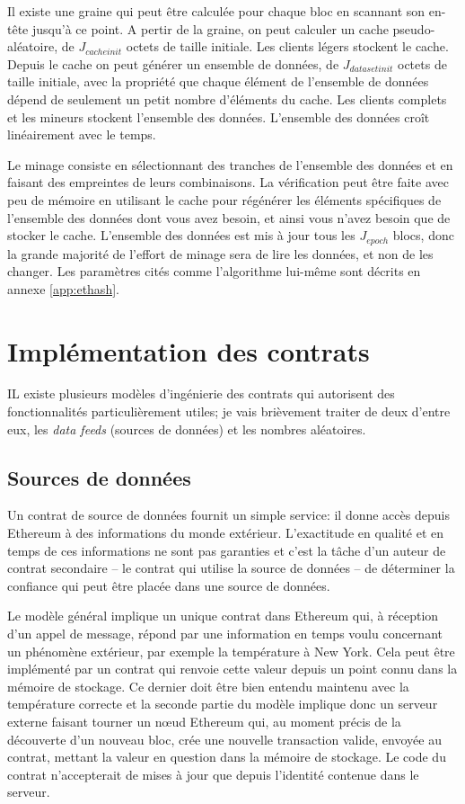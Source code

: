 \documentclass[9pt,oneside]{amsart}
\begin{document}
\begin{multicols}{2}
Il existe une graine qui peut être calculée pour chaque bloc en scannant son en-tête jusqu'à ce point. A pertir de la graine, on peut calculer un cache pseudo-aléatoire, de $J_{cacheinit}$ octets de taille initiale. Les clients légers stockent le cache. Depuis le cache on peut générer un ensemble de données, de $J_{datasetinit}$ octets de taille initiale, avec la propriété que chaque élément de l'ensemble de données dépend de seulement un petit nombre d'éléments du cache. Les clients complets et les mineurs stockent l'ensemble des données. L'ensemble des données croît linéairement avec le temps. 


Le minage consiste en sélectionnant des tranches de l'ensemble des données et en faisant des empreintes de leurs combinaisons. La vérification peut être faite avec peu de mémoire en utilisant le cache pour régénérer les éléments spécifiques de l'ensemble des données dont vous avez besoin, et ainsi vous n'avez besoin que de stocker le cache. L'ensemble des données est mis à jour tous les $J_{epoch}$ blocs, donc la grande majorité de l'effort de minage sera de lire les données, et non de les changer. Les paramètres cités comme l'algorithme lui-même sont décrits en annexe \ref{app:ethash}.

\section{Implémentation des contrats}

IL existe plusieurs modèles d'ingénierie des contrats qui autorisent des fonctionnalités particulièrement utiles; je vais brièvement traiter de deux d'entre eux, les \textit{data feeds} (sources de données) et les nombres aléatoires.

\subsection{Sources de données}
Un contrat de source de données fournit un simple service: il donne accès depuis Ethereum à des informations du monde extérieur. L'exactitude en qualité et en temps de ces informations ne sont pas garanties et c'est la tâche d'un auteur de contrat secondaire -- le contrat qui utilise la source de données -- de déterminer la confiance qui peut être placée dans une source de données. 

Le modèle général implique un unique contrat dans Ethereum qui, à réception d'un appel de message, répond par une information en temps voulu concernant un phénomène extérieur, par exemple la température à New York. Cela peut être implémenté par un contrat qui renvoie cette valeur depuis un point connu dans la mémoire de stockage. Ce dernier doit être bien entendu maintenu avec la température correcte et la seconde partie du modèle implique donc un serveur externe faisant tourner un n\oe{}ud Ethereum qui, au moment précis de la découverte d'un nouveau bloc, crée une nouvelle transaction valide, envoyée au contrat, mettant la valeur en question dans la mémoire de stockage. Le code du contrat n'accepterait de mises à jour que depuis l'identité contenue dans le serveur.


\end{multicols}
\end{document}
